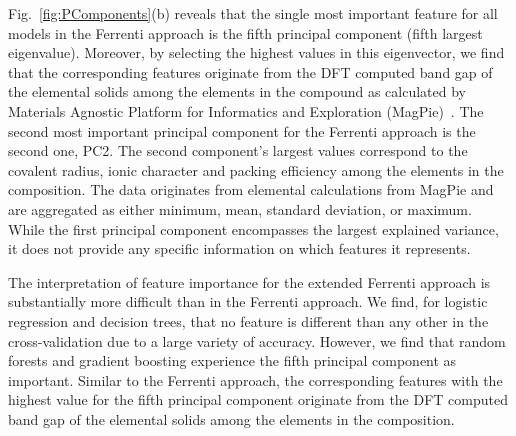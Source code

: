 \documentclass[superscriptaddress,unsortedaddress,
 amsmath,amssymb,
 aps,
]{revtex4-2}
\begin{document}
Fig.~\ref{fig:PComponents}(b) reveals that the single most important feature for all models in the Ferrenti approach is the fifth principal component (fifth largest eigenvalue). Moreover, by selecting the highest values in this eigenvector, we find that the corresponding features originate from the DFT computed band gap of the elemental solids among the elements in the compound as calculated by Materials Agnostic Platform for Informatics and Exploration (MagPie)~\cite{magpie}. 
The second most important principal component for the Ferrenti approach is the second one, PC2. 
The second component's largest values correspond to the 
covalent radius, ionic character and packing efficiency  
among the elements in the composition. 
The data originates from elemental calculations from MagPie and are aggregated as either minimum, mean, standard deviation, or maximum. 
While the first principal component encompasses the largest explained variance, it does not provide any specific information on which features it represents.

The interpretation of feature importance for the extended Ferrenti approach is substantially more difficult than in the Ferrenti approach. We find, for logistic regression and decision trees, that no feature is different than any other in the cross-validation due to a large variety of accuracy. However, we find that random forests and gradient boosting experience the fifth principal component as important. Similar to the Ferrenti approach, the corresponding features with the highest value for the fifth principal component originate from the DFT computed band gap of the elemental solids among the elements in the composition. 
\end{document}
